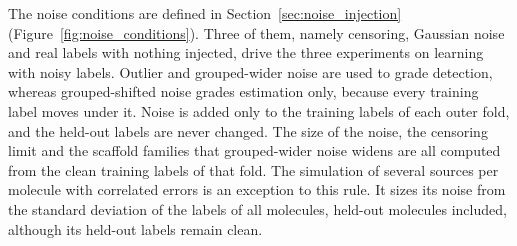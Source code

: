 
The noise conditions are defined in Section~\ref{sec:noise_injection} (Figure~\ref{fig:noise_conditions}). Three of them, namely censoring, Gaussian noise and real labels with nothing injected, drive the three experiments on learning with noisy labels. Outlier and grouped-wider noise are used to grade detection, whereas grouped-shifted noise grades estimation only, because every training label moves under it. Noise is added only to the training labels of each outer fold, and the held-out labels are never changed. The size of the noise, the censoring limit and the scaffold families that grouped-wider noise widens are all computed from the clean training labels of that fold.
The simulation of several sources per molecule with correlated errors is an exception to this rule. It sizes its noise from the standard deviation of the labels of all molecules, held-out molecules included, although its held-out labels remain clean.

